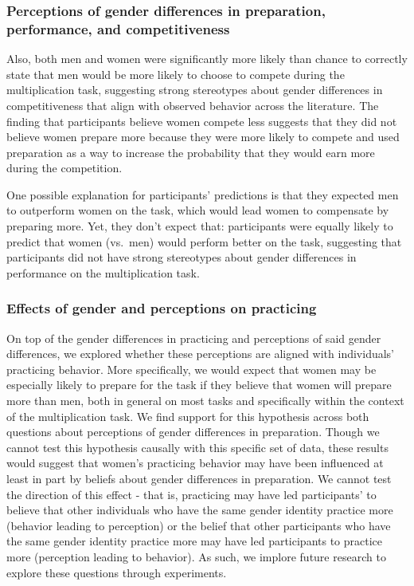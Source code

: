 \documentclass[a4paper, nobind]{templates/ociamthesis}
\begin{document}
\hypertarget{perceptions-of-gender-differences-in-preparation-performance-and-competitiveness-1}{%
\subsubsection{Perceptions of gender differences in preparation, performance, and competitiveness}\label{perceptions-of-gender-differences-in-preparation-performance-and-competitiveness-1}}

Also, both men and women were significantly more likely than chance to correctly state that men would be more likely to choose to compete during the multiplication task, suggesting strong stereotypes about gender differences in competitiveness that align with observed behavior across the literature. The finding that participants believe women compete less suggests that they did not believe women prepare more because they were more likely to compete and used preparation as a way to increase the probability that they would earn more during the competition.

One possible explanation for participants' predictions is that they expected men to outperform women on the task, which would lead women to compensate by preparing more. Yet, they don't expect that: participants were equally likely to predict that women (vs.~men) would perform better on the task, suggesting that participants did not have strong stereotypes about gender differences in performance on the multiplication task.

\hypertarget{effects-of-gender-and-perceptions-on-practicing-1}{%
\subsubsection{Effects of gender and perceptions on practicing}\label{effects-of-gender-and-perceptions-on-practicing-1}}

On top of the gender differences in practicing and perceptions of said gender differences, we explored whether these perceptions are aligned with individuals' practicing behavior. More specifically, we would expect that women may be especially likely to prepare for the task if they believe that women will prepare more than men, both in general on most tasks and specifically within the context of the multiplication task. We find support for this hypothesis across both questions about perceptions of gender differences in preparation. Though we cannot test this hypothesis causally with this specific set of data, these results would suggest that women's practicing behavior may have been influenced at least in part by beliefs about gender differences in preparation. We cannot test the direction of this effect - that is, practicing may have led participants' to believe that other individuals who have the same gender identity practice more (behavior leading to perception) or the belief that other participants who have the same gender identity practice more may have led participants to practice more (perception leading to behavior). As such, we implore future research to explore these questions through experiments.
\end{document}
